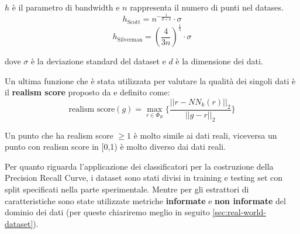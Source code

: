 \(h\) è il parametro di bandwidth e \(n\) rappresenta il numero di punti nel datases.
\begin{equation}
    h_{\text{Scott}} = n^{-\frac{1}{d+4}} \cdot \sigma
\end{equation}
\begin{equation}
    h_{\text{Silverman}} = \left(\frac{4}{3n}\right)^{\frac{1}{5}} \cdot \sigma
\end{equation}

dove \(\sigma\) è la deviazione standard del dataset e \(d\) è la dimensione dei dati.

Un ultima funzione che è stata utilizzata per valutare la qualità dei singoli dati è il \textbf{realism score} proposto da \cite{2ImprovedPrecisionRecall} e definito come:
\begin{equation}
    \text{realism score}(g) = \max_{r \in \Phi_R} \{ \frac{||r-NN_k(r)||_2}{||g-r||_2} \}
\end{equation}

Un punto che ha realism score \(\ge 1\) è molto simile ai dati reali, viceversa un punto con realism score in [0,1) è molto diverso dai dati reali.

Per quanto riguarda l'applicazione dei classificatori per la costruzione della Precision Recall Curve, i dataset sono stati divisi in training e testing set con split specificati nella parte sperimentale. Mentre per gli estrattori di caratteristiche sono state utilizzate metriche \textbf{informate} e \textbf{non informate} del dominio dei dati (per queste chiariremo meglio in seguito \ref{sec:real-world-dataset}).
